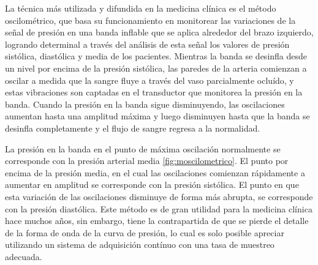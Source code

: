 La técnica más utilizada y difundida en la medicina clínica es el método oscilométrico, que basa su funcionamiento en monitorear las variaciones de la señal de presión en una banda inflable que se aplica alrededor del brazo izquierdo, logrando determinal a través del análisis de esta señal los valores de presión sistólica, diastólica y media de los pacientes. Mientras la banda se desinfla desde un nivel por encima de la presión sistólica, las paredes de la arteria comienzan a oscilar a medida que la sangre fluye a través del vaso parcialmente ocluído, y estas vibraciones son captadas en el transductor que monitorea la presión en la banda. Cuando la presión en la banda sigue disminuyendo, las oscilaciones aumentan hasta una amplitud máxima y luego disminuyen  hasta que la banda se desinfla completamente y el flujo de sangre regresa a la normalidad.

La presión en la banda en el punto de máxima oscilación normalmente se corresponde con la presión arterial media \ref{fig:moscilometrico}. El punto por encima de la presión media, en el cual las oscilaciones comienzan rápidamente a aumentar en amplitud se corresponde con la presión sistólica. El punto en que esta variación de las oscilaciones disminuye de forma más abrupta, se corresponde con la presión diastólica. Este método es de gran utilidad para la medicina clínica hace muchos años, sin embargo, tiene la contrapartida de que se pierde el detalle de la forma de onda de la curva de presión, lo cual es solo posible apreciar utilizando un sistema de adquisición contínuo con una tasa de muestreo adecuada.



